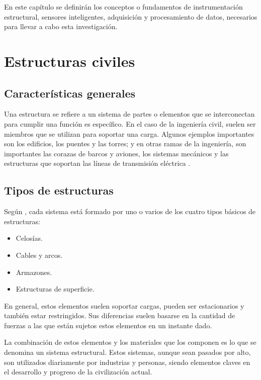 
En este capítulo se definirán los conceptos  o fundamentos de instrumentación estructural, sensores inteligentes, adquisición y procesamiento de datos, necesarios para llevar a cabo esta investigación.

\section{Estructuras civiles}

\subsection{Características generales}

Una estructura se refiere a un sistema de partes o elementos que se interconectan para cumplir una función es específico. En el caso de la ingeniería civil, suelen ser miembros que se utilizan para soportar una carga. Algunos ejemplos importantes son los edificios, los puentes y las torres; y en otras ramas de la ingeniería, son importantes las corazas de barcos y aviones, los sistemas mecánicos y las estructuras que soportan las líneas de transmisión eléctrica \citep{hibbeler1997structural}.

\subsection{Tipos de estructuras}

Según \citet{hibbeler1997structural}, cada sistema está formado por uno o varios de los cuatro tipos básicos de estructuras: 

\begin{itemize}
    \item Celosías.
    \item Cables y arcos.
    \item Armazones.
    \item Estructuras de superficie.
\end{itemize}

En general, estos elementos suelen soportar cargas, pueden ser estacionarios y también estar restringidos. Sus diferencias suelen basarse en la cantidad de fuerzas a las que están sujetos estos elementos en un instante dado.

La combinación de estos elementos y los materiales que los componen es lo que se denomina un sistema estructural. Estos sistemas, aunque sean pasados por alto, son utilizados diariamente por industrias y personas, siendo elementos claves en el desarrollo y progreso de la civilización actual.

